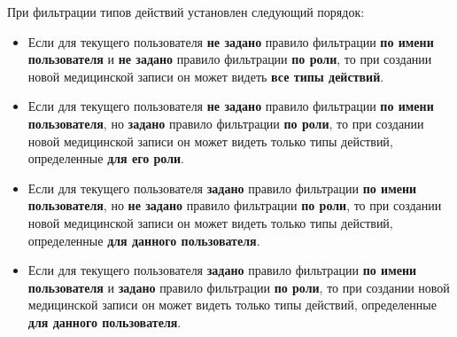 При фильтрации типов действий установлен следующий порядок:
\begin{itemize}
 \item Если для текущего пользователя \textbf{не задано} правило фильтрации \textbf{по имени пользователя} и \textbf{не задано} правило фильтрации \textbf{по роли}, то при создании новой медицинской записи он может видеть \textbf{все типы действий}.
 \item Если для текущего пользователя \textbf{не задано} правило фильтрации \textbf{по имени пользователя}, но \textbf{задано} правило фильтрации \textbf{по роли}, то при создании новой медицинской записи он может видеть только  типы действий, определенные \textbf{для его роли}.
 \item Если для текущего пользователя \textbf{задано} правило фильтрации \textbf{по имени пользователя}, но \textbf{не задано} правило фильтрации \textbf{по роли}, то при создании новой медицинской записи он может видеть только типы действий, определенные \textbf{для данного пользователя}.
 \item Если для текущего пользователя \textbf{задано} правило фильтрации \textbf{по имени пользователя} и \textbf{задано} правило фильтрации \textbf{по роли}, то при создании новой медицинской записи он может видеть только типы действий, определенные \textbf{для данного пользователя}.
\end{itemize}
 
